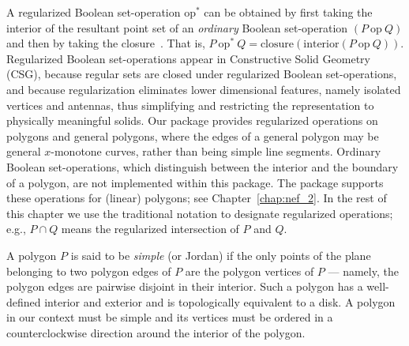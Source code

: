 A regularized Boolean set-operation $\mbox{op}^*$ can be obtained by
first taking the interior of the resultant point set of an {\em ordinary}
Boolean set-operation $(P\ \mbox{op}\ Q)$ and then by taking the
closure~\cite{cgal:h-sm-04}. That is,
$P\ \mbox{op}^*\ Q = \mbox{closure}(\mbox{interior} (P\ \mbox{op}\ Q))$.
Regularized Boolean set-operations appear in Constructive Solid
Geometry (CSG), because regular sets are closed under regularized
Boolean set-operations, and because regularization eliminates lower
dimensional features, namely isolated vertices and antennas, thus
simplifying and restricting the representation to physically meaningful
solids. Our package provides regularized operations on polygons and
general polygons, where the edges of a general polygon may be
general $x$-monotone curves, rather than being simple line segments.
Ordinary Boolean set-operations, which distinguish between the
interior and the boundary of a polygon, are not implemented within this
package. The  package supports these operations for (linear)
polygons; see Chapter~\ref{chap:nef_2}. In the rest of this chapter we
use the traditional notation to designate regularized operations; e.g.,
$P \cap Q$ means the regularized intersection of $P$ and $Q$.

A polygon $P$ is said to be {\em simple} (or Jordan) if the
only points of the plane belonging to two polygon edges of $P$ are the
polygon vertices of $P$ --- namely, the polygon edges are pairwise disjoint
in their interior. Such a polygon has a well-defined interior
and exterior and is topologically equivalent to a disk. A polygon in our
context must be simple and its vertices must be ordered in a counterclockwise
direction around the interior of the polygon.
 
